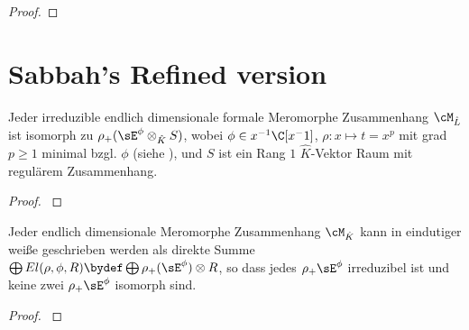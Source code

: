 \begin{proof}
\end{proof} %

\section{Sabbah's Refined version}
\begin{prop}
\cite[Prop 3.1]{sabbah_Fourier-local}
Jeder irreduzible endlich dimensionale formale Meromorphe Zusammenhang
$\cM_{\hat L}$ ist isomorph zu $\rho_+(\sE^\phi\otimes_{\hat K} S)$, wobei
$\phi\in x^{-1}\C[x^-1]$, $\rho:x\mapsto t=x^p$ mit grad $p\geq1$ minimal bzgl.
$\phi$ (siehe \cite[Rem 2.8]{sabbah_Fourier-local}), und $S$ ist ein Rang $1$
$\hat K$-Vektor Raum mit regulärem Zusammenhang.
\end{prop}
\begin{proof}
\cite[Prop 3.1]{sabbah_Fourier-local}
\end{proof}

\begin{thm}
\cite[Cor 3.3]{sabbah_Fourier-local}
Jeder endlich dimensionale Meromorphe Zusammenhang $\cM_{\hat K}$ kann in
eindutiger weiße geschrieben werden als direkte Summe $\bigoplus
El(\rho,\phi,R)\bydef\bigoplus\rho_+(\sE^\phi)\otimes R$, so dass
jedes $\rho_+\sE^\phi$ irreduzibel ist und keine zwei $\rho_+\sE^\phi$ isomorph
sind.
\end{thm}
\begin{comment}
In welchem Raum ist $\cM$ ?? in $L$ oder in $K$
\end{comment}
\begin{proof}
\cite[Cor 3.3]{sabbah_Fourier-local}
\end{proof}

